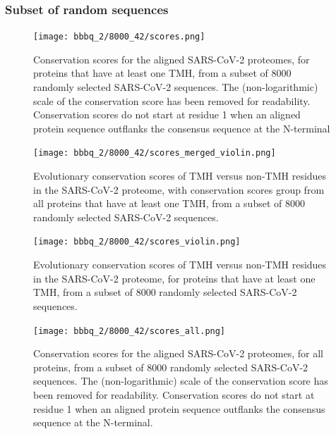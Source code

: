 \subsubsection{Subset of random sequences}


\begin{figure}[!htbp]
  \texttt{[image: bbbq\_2/8000\_42/scores.png]}
  \caption{
    Conservation scores for the aligned SARS-CoV-2 proteomes,
    for proteins that have at least one TMH,
    from a subset of 8000 randomly selected SARS-CoV-2 sequences.
    The (non-logarithmic) scale of the conservation score has been removed
    for readability.
    Conservation scores do not start at residue 1 when
    an aligned protein sequence outflanks the consensus sequence 
    at the N-terminal
  }
  \label{fig:evolutionary_conservation_8k}
\end{figure}

\begin{figure}[!htbp]
  \texttt{[image: bbbq\_2/8000\_42/scores\_merged\_violin.png]}
  \caption{
    Evolutionary conservation scores of TMH versus non-TMH
    residues in the SARS-CoV-2 proteome,
    with conservation scores group from all proteins that have at least one TMH,
    from a subset of 8000 randomly selected SARS-CoV-2 sequences.
  }
  \label{fig:evolutionary_conservation_8k_merged}
\end{figure}

\begin{figure}[!htbp]
  \texttt{[image: bbbq\_2/8000\_42/scores\_violin.png]}
  \caption{
    Evolutionary conservation scores of TMH versus non-TMH
    residues in the SARS-CoV-2 proteome,
    for proteins that have at least one TMH,
    from a subset of 8000 randomly selected SARS-CoV-2 sequences.
  }
  \label{fig:evolutionary_conservation_8k_violin}
\end{figure}

\begin{figure}[!htbp]
  \texttt{[image: bbbq\_2/8000\_42/scores\_all.png]}
  \caption{
    Conservation scores for the aligned SARS-CoV-2 proteomes,
    for all proteins,
    from a subset of 8000 randomly selected SARS-CoV-2 sequences.
    The (non-logarithmic) scale of the conservation score has been removed
    for readability.
    Conservation scores do not start at residue 1 when
    an aligned protein sequence outflanks the consensus sequence 
    at the N-terminal.
  }
  \label{fig:evolutionary_conservation_8k_all}
\end{figure}

